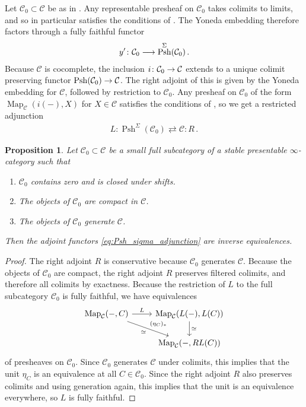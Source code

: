\documentclass[10pt]{amsart}
\numberwithin{equation}{section}
\newtheorem{prop}{Proposition}[subsection]
\theoremstyle{definition}
\DeclareMathOperator{\Map}{Map}
\DeclareMathOperator{\Psh}{Psh}
\newcommand{\cC}{\mathcal{C}}
\renewcommand{\to}{\mathchoice{\longrightarrow}{\rightarrow}{}{}}
\begin{document}
Let $\cC_{0}\subset \cC$ be as in .
Any representable presheaf on $\cC_{0}$ takes colimits to limits, and so in particular satisfies the conditions of .
The Yoneda embedding therefore factors through a fully faithful functor
\begin{align*}
	y'\colon \cC_{0} \to \Psh^{\Sigma}(\cC_{0}) \,.
\end{align*}
Because $\cC$ is cocomplete, the inclusion $i\colon \cC_{0} \to \cC$ extends to a unique colimit preserving functor $\Psh(\cC_{0}) \to \cC$.
The right adjoint of this is given by the Yoneda embedding for $\cC$, followed by restriction to $\cC_{0}$.
Any presheaf on $\cC_{0}$ of the form $\Map_{\cC}(i(-), X)$ for $X\in \cC$ satisfies the conditions of , so we get a restricted adjunction
\begin{align}\label{eq:Psh_sigma_adjunction}
	L : \Psh^{\Sigma}(\cC_{0}) \rightleftarrows \cC: R \,.
\end{align}
\begin{prop}\label{prop:generation_rigidity}
	Let $\cC_{0} \subset \cC$ be a small full subcategory of a stable presentable $\infty$-category such that
	\begin{enumerate}
		\item $\cC_{0}$ contains zero and is closed under shifts.
		\item The objects of $\cC_{0}$ are compact in $\cC$.
		\item The objects of $\cC_{0}$ generate $\cC$.
	\end{enumerate}
	Then the adjoint functors \eqref{eq:Psh_sigma_adjunction} are inverse equivalences.
\end{prop}
\begin{proof}
	The right adjoint $R$ is conservative because $\cC_{0}$ generates $\cC$.
  Because the objects of $\cC_{0}$ are compact, the right adjoint $R$ preserves filtered colimits, and therefore all colimits by exactness.
  Because the restriction of $L$ to the full subcategory $\cC_{0}$ is fully faithful, we have equivalences
	\begin{equation*}
		\begin{tikzcd}
			\Map_{\cC}(-, C) \arrow[r, "L"] \arrow[dr, "(\eta_{C})_{*}", "\simeq"']      &   \Map_{\cC}(L(-), L(C))  \arrow[d, "\simeq"] \\
			&   \Map_{\cC}(-, RL(C))
		\end{tikzcd}
	\end{equation*}
	of presheaves on $\cC_{0}$.
  Since $\cC_{0}$ generates $\cC$ under colimits, this implies that the unit $\eta_{C}$ is an equivalence at all $C\in \cC_{0}$.
  Since the right adjoint $R$ also preserves colimits and using generation again, this implies that the unit is an equivalence everywhere, so $L$ is fully faithful.
\end{proof}
\end{document}
